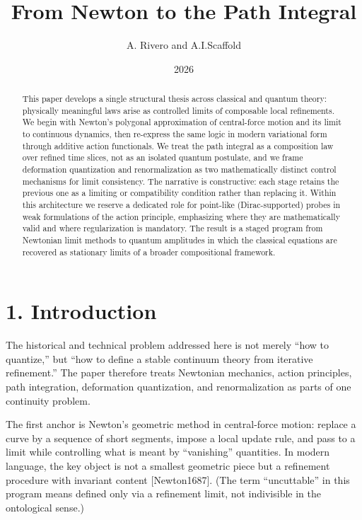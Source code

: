 \documentclass[
]{article}
\title{From Newton to the Path Integral}
\author{A. Rivero and A.I.Scaffold}
\date{2026}
\begin{document}
\maketitle
\begin{abstract}
This paper develops a single structural thesis across classical and
quantum theory: physically meaningful laws arise as controlled limits of
composable local refinements. We begin with Newton's polygonal
approximation of central-force motion and its limit to continuous
dynamics, then re-express the same logic in modern variational form
through additive action functionals. We treat the path integral as a
composition law over refined time slices, not as an isolated quantum
postulate, and we frame deformation quantization and renormalization as
two mathematically distinct control mechanisms for limit consistency.
The narrative is constructive: each stage retains the previous one as a
limiting or compatibility condition rather than replacing it. Within
this architecture we reserve a dedicated role for point-like
(Dirac-supported) probes in weak formulations of the action principle,
emphasizing where they are mathematically valid and where regularization
is mandatory. The result is a staged program from Newtonian limit
methods to quantum amplitudes in which the classical equations are
recovered as stationary limits of a broader compositional framework.
\end{abstract}

\hypertarget{introduction}{%
\section{1. Introduction}\label{introduction}}

The historical and technical problem addressed here is not merely ``how
to quantize,'' but ``how to define a stable continuum theory from
iterative refinement.'' The paper therefore treats Newtonian mechanics,
action principles, path integration, deformation quantization, and
renormalization as parts of one continuity problem.

The first anchor is Newton's geometric method in central-force motion:
replace a curve by a sequence of short segments, impose a local update
rule, and pass to a limit while controlling what is meant by
``vanishing'' quantities. In modern language, the key object is not a
smallest geometric piece but a refinement procedure with invariant
content {[}Newton1687{]}. (The term ``uncuttable'' in this program means
defined only via a refinement limit, not indivisible in the ontological
sense.)
\end{document}

